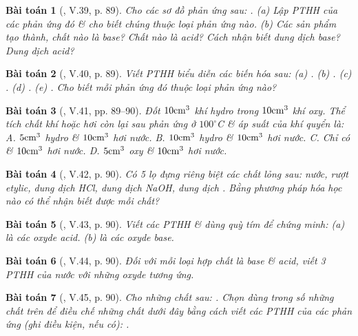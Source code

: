 \documentclass{article}
\newtheorem{baitoan}{Bài toán}
\begin{document}
\begin{baitoan}[\cite{Truong_BTNC_Hoa_Hoc_8_2022}, V.39, p. 89]
	Cho các sơ đồ phản ứng sau: \emph{}. (a) Lập PTHH của các phản ứng đó \& cho biết chúng thuộc loại phản ứng nào. (b) Các sản phẩm tạo thành, chất nào là base? Chất nào là acid? Cách nhận biết dung dịch base? Dung dịch acid?
\end{baitoan}

\begin{baitoan}[\cite{Truong_BTNC_Hoa_Hoc_8_2022}, V.40, p. 89]
	Viết PTHH biểu diễn các biến hóa sau: (a) \emph{}. (b) \emph{}. (c) \emph{}. (d) \emph{}. (e) \emph{}. Cho biết mỗi phản ứng đó thuộc loại phản ứng nào?
\end{baitoan}

\begin{baitoan}[\cite{Truong_BTNC_Hoa_Hoc_8_2022}, V.41, pp. 89--90]
	Đốt $\rm10cm^3$ khí hydro trong $\rm10cm^3$ khí oxy. Thể tích chất khí hoặc hơi còn lại sau phản ứng ở $100^\circ$C \& áp suất của khí quyển là: {\sf A.} $\rm5cm^3$ hydro \& $\rm10cm^3$ hơi nước. {\sf B.} $\rm10cm^3$ hydro \& $\rm10cm^3$ hơi nước. {\sf C.} Chỉ có \& $\rm10cm^3$ hơi nước. {\sf D.} $\rm5cm^3$ oxy \& $\rm10cm^3$ hơi nước. 
\end{baitoan}

\begin{baitoan}[\cite{Truong_BTNC_Hoa_Hoc_8_2022}, V.42, p. 90]
	Có 5 lọ đựng riêng biệt các chất lỏng sau: nước, rượt etylic, dung dịch \emph{HCl}, dung dịch \emph{NaOH}, dung dịch \emph{}. Bằng phương pháp hóa học nào có thể nhận biết được mỗi chất?
\end{baitoan}

\begin{baitoan}[\cite{Truong_BTNC_Hoa_Hoc_8_2022}, V.43, p. 90]
	Viết các PTHH \& dùng quỳ tím để chứng minh: (a) \emph{} là các oxyde acid. (b) \emph{} là các oxyde base.
\end{baitoan}

\begin{baitoan}[\cite{Truong_BTNC_Hoa_Hoc_8_2022}, V.44, p. 90]
	Đối với mỗi loại hợp chất là base \& acid, viết 3 PTHH của nước với những oxyde tương ứng.
\end{baitoan}

\begin{baitoan}[\cite{Truong_BTNC_Hoa_Hoc_8_2022}, V.45, p. 90]
	Cho những chất sau: \emph{}. Chọn dùng trong số những chất trên để điều chế những chất dưới đây bằng cách viết các PTHH của các phản ứng (ghi điều kiện, nếu có): \emph{}.
\end{baitoan}
\end{document}
